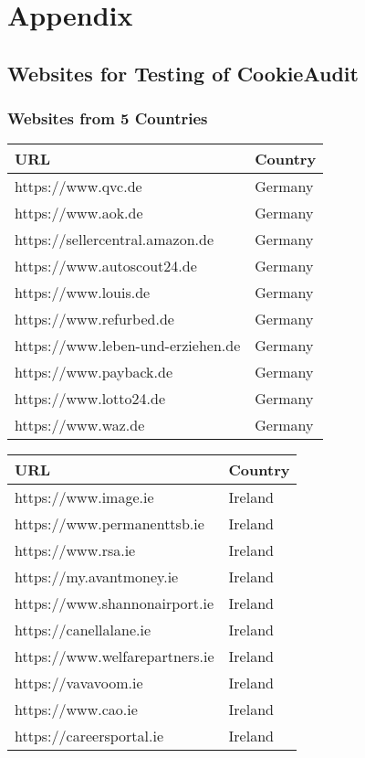 \chapter{Appendix}

\section{Websites for Testing of CookieAudit}
\subsection{Websites from 5 Countries}

\begin{center}
\begin{tabular}{ll}
	\toprule
	URL   & Country        \\
	\midrule
    https://www.qvc.de & Germany  \\
    https://www.aok.de & Germany  \\
    https://sellercentral.amazon.de & Germany  \\
    https://www.autoscout24.de & Germany  \\
    https://www.louis.de & Germany  \\
    https://www.refurbed.de & Germany  \\
    https://www.leben-und-erziehen.de & Germany  \\
    https://www.payback.de & Germany  \\
    https://www.lotto24.de & Germany  \\
    https://www.waz.de & Germany  \\
	\bottomrule
\end{tabular}
\end{center}

\begin{center}
\begin{tabular}{ll}
	\toprule
	URL   & Country        \\
	\midrule
    https://www.image.ie & Ireland  \\
    https://www.permanenttsb.ie & Ireland  \\
    https://www.rsa.ie & Ireland  \\
    https://my.avantmoney.ie & Ireland  \\
    https://www.shannonairport.ie & Ireland  \\
    https://canellalane.ie & Ireland  \\
    https://www.welfarepartners.ie & Ireland  \\
    https://vavavoom.ie & Ireland  \\
    https://www.cao.ie & Ireland  \\
    https://careersportal.ie & Ireland  \\
	\bottomrule
\end{tabular}
\end{center}

